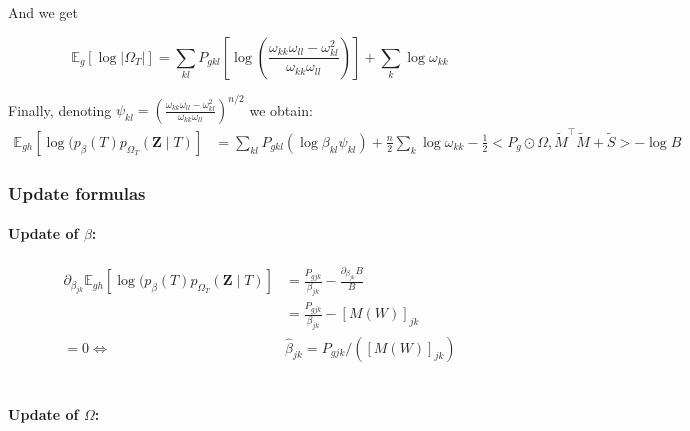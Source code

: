\documentclass[11pt,a4paper]{article}
\newcommand{\Zbf}{\boldsymbol{Z}}
\newcommand{\Esp}{\mathds{E}}
\begin{document}
And we get

$$\Esp_g[\log |\Omega_{T}|]= \sum _{kl} P_{gkl} \left[ \log\left(\frac{\omega_{kk}\omega_{ll}-\omega_{kl}^2}{\omega_{kk}\omega_{ll}}\right)\right] + \sum_k \log \omega_{kk}$$

Finally, denoting $\psi_{kl} = \left(\frac{\omega_{kk}\omega_{ll}-\omega_{kl}^2}{\omega_{kk}\omega_{ll}}\right)^{n/2}$ we obtain:
\begin{align*}
\Esp_{gh} [\log (p_\beta(T)p_{\Omega_T}(\Zbf\mid T) ] &=\sum_{kl} P_{gkl} \left(\log  \beta_{kl}\psi_{kl}\right) + \frac{n}{2}\sum_k \log \omega_{kk} - \frac{1}{2}<P_g \odot \Omega, \widetilde{M}^\intercal \widetilde{M} + \widetilde{S}>- \log B
\end{align*}
 
\subsubsection{Update formulas}
\paragraph{Update of $\beta$:}
\begin{align*}
\partial_{\beta_{jk}} \Esp_{gh} [\log (p_\beta(T)p_{\Omega_T}(\Zbf\mid T) ] &= \frac{P_{gjk}}{\beta_{jk}} - \frac{\partial_{\beta_{jk}} B }{B} \\
&=\frac{P_{gjk}}{\beta_{jk}}  - [M(W)]_{jk} \\
=0 \iff & \boxed{\widehat{\beta}_{jk} = P_{gjk} / ([M(W)]_{jk})}
\end{align*}\\


\paragraph{Update of $\Omega$:}
\end{document}
